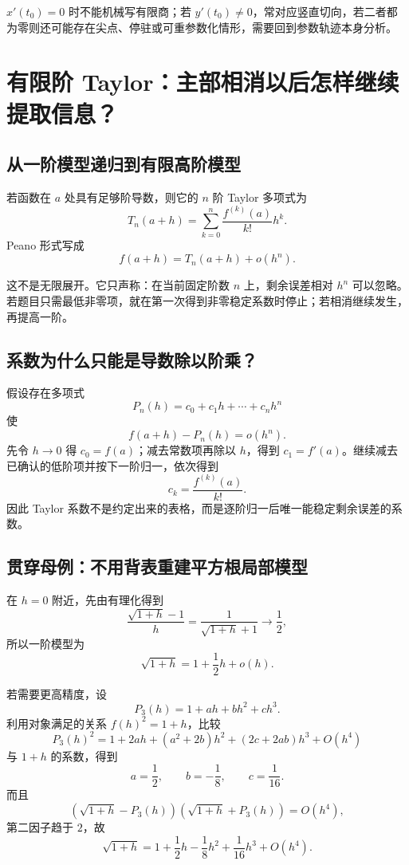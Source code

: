 \documentclass[11pt,a4paper]{ctexart}
\begin{document}
$x'(t_0)=0$ 时不能机械写有限商；若 $y'(t_0)\ne0$，常对应竖直切向，若二者都为零则还可能存在尖点、停驻或可重参数化情形，需要回到参数轨迹本身分析。

\section{有限阶 Taylor：主部相消以后怎样继续提取信息？}

\subsection{从一阶模型递归到有限高阶模型}

若函数在 $a$ 处具有足够阶导数，则它的 $n$ 阶 Taylor 多项式为
\[
T_n(a+h)=\sum_{k=0}^{n}\frac{f^{(k)}(a)}{k!}h^k.
\]
Peano 形式写成
\[
\boxed{f(a+h)=T_n(a+h)+o(h^n)}.
\]

这不是无限展开。它只声称：在当前固定阶数 $n$ 上，剩余误差相对 $h^n$ 可以忽略。若题目只需最低非零项，就在第一次得到非零稳定系数时停止；若相消继续发生，再提高一阶。

\subsection{系数为什么只能是导数除以阶乘？}

假设存在多项式
\[
P_n(h)=c_0+c_1h+\cdots+c_n h^n
\]
使
\[
f(a+h)-P_n(h)=o(h^n).
\]
先令 $h\to0$ 得 $c_0=f(a)$；减去常数项再除以 $h$，得到 $c_1=f'(a)$。继续减去已确认的低阶项并按下一阶归一，依次得到
\[
c_k=\frac{f^{(k)}(a)}{k!}.
\]
因此 Taylor 系数不是约定出来的表格，而是逐阶归一后唯一能稳定剩余误差的系数。

\subsection{贯穿母例：不用背表重建平方根局部模型}

在 $h=0$ 附近，先由有理化得到
\[
\frac{\sqrt{1+h}-1}{h}
=\frac1{\sqrt{1+h}+1}\to\frac12,
\]
所以一阶模型为
\[
\sqrt{1+h}=1+\frac12h+o(h).
\]

若需要更高精度，设
\[
P_3(h)=1+ah+bh^2+ch^3.
\]
利用对象满足的关系 ${f(h)}^2=1+h$，比较
\[
{P_3(h)}^2
=1+2ah+(a^2+2b)h^2+(2c+2ab)h^3+O(h^4)
\]
与 $1+h$ 的系数，得到
\[
a=\frac12,
\qquad b=-\frac18,
\qquad c=\frac1{16}.
\]
而且
\[
(\sqrt{1+h}-P_3(h))(\sqrt{1+h}+P_3(h))=O(h^4),
\]
第二因子趋于 $2$，故
\[
\boxed{\sqrt{1+h}=1+\frac12h-\frac18h^2+\frac1{16}h^3+O(h^4)}.
\]
\end{document}
